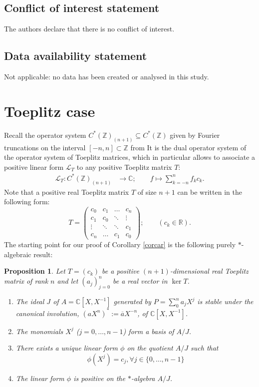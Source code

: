 \documentclass{amsart}
\newtheorem{prop}[thm]{Proposition}
\def\C{{\mathbb C}}
\def\R{{\mathbb R}}
\def\Z{{\mathbb Z}}
\def\C{{\mathbb C}}
\def\R{{\mathbb R}}
\def\Z{{\mathbb Z}}
\def\L{{\mathcal L}}
\def\tilde{\widetilde}
\begin{document}
\subsection*{Conflict of interest statement}
The authors declare that there is no conflict of interest.

\subsection*{Data availability statement}
Not applicable: no data has been created or analysed in this study.




\section{Toeplitz case}
Recall the operator system $C^*(\Z)_{(n+1)} \subseteq C^*(\Z)$ given by Fourier truncations on the interval $[-n,n] \subset \Z$ from \cite{CW}
It is the dual operator system of the operator system of Toeplitz matrices, which in particular allows to associate a positive linear form $\mathcal L_T$ to any positive Toeplitz matrix $T$:
\begin{align*}
  \mathcal L_T: C^*(\Z)_{(n+1)} &\to \C; \qquad 
f \mapsto \sum_{k=-n}^n f_{k} c_k.
  \end{align*}
Note that a  positive real Toeplitz matrix $T$ of size $n+1$ can be written in the following form:
$$
T = \begin{pmatrix}
  c_0 & c_1 & \ldots & c_n\\
  c_1 & c_0 & \ddots &\vdots \\
  \vdots &\ddots  & \ddots &  c_1 \\
  c_n & \ldots & c_1 & c_0 
    \end{pmatrix} ; \qquad (c_k \in \R).
$$
The starting point for our proof of Corollary \ref{corcar} is the following purely $*$-algebraic result:
\begin{prop}
  Let $T = (c_k)$ be a positive $(n+1)$-dimensional real Toeplitz matrix of rank $n$ and let $(a_j)_{j=0}^n$  be a real vector in $\ker T$.
  \begin{enumerate}
  \item The ideal $J$ of $A=\C[X,X^{-1}]$ generated by $P=\sum_0^n a_j X^j$ is stable under the canonical involution, $(aX^n)^*:=\overline{a}X^{-n}$, of $\C[X,X^{-1}]$.
    \item The monomials $X^j$ ($j = 0,\ldots, n-1$) form a basis of $A/J$.
  \item There exists a unique linear form $\phi$ on the quotient $A/J$ such that 
  \begin{equation}\label{phi}
  \phi(X^j)=c_j, \forall j\in \{0,\ldots,n-1\}
 \end{equation}
    \item The linear form $\phi$ is positive on the $*$-algebra $A/J$.	
    \end{enumerate}
\end{prop}
\end{document}
